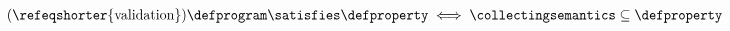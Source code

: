   \begin{align} \tag{\refeqshorter{validation}}
    \defprogram \satisfies \defproperty \iff \collectingsemantics \subseteq \defproperty
  \end{align}
